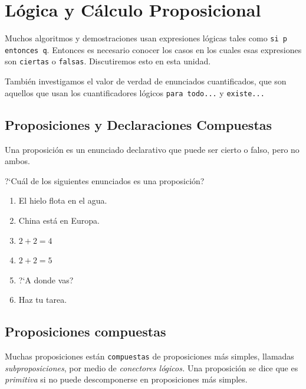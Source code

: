 \section{L\'ogica y C\'alculo Proposicional}


    Muchos algoritmos y demostraciones usan expresiones l\'ogicas tales como
    \texttt{si p entonces q}. Entonces es necesario conocer los casos en los cuales esas expresiones son \texttt{ciertas} o \texttt{falsas}. Discutiremos esto en esta unidad. 





    Tambi\'en investigamos el valor de verdad de enunciados cuantificados, que son aquellos que usan los cuantificadores l\'ogicos \texttt{para todo...} y \texttt{existe...}


\subsection{Proposiciones y Declaraciones Compuestas}


    Una proposici\'on es un enunciado declarativo que puede ser cierto o falso, pero no ambos. 



    \begin{problema}
        ?`Cu\'al de los siguientes enunciados es una proposici\'on?
        \begin{multicols}{2}
            \begin{enumerate}
                \item El hielo flota en el agua.
                \item China est\'a en Europa.
                \item $2+2=4$
                \item $2+2=5$
                \item ?`A donde vas?
                \item Haz tu tarea.
            \end{enumerate}
        \end{multicols}
    \end{problema}
    


\subsection{Proposiciones compuestas}


    Muchas proposiciones est\'an \texttt{compuestas} de proposiciones m\'as simples, llamadas \emph{subproposiciones}, por medio de \emph{conectores l\'ogicos.}  Una proposici\'on se dice que es \emph{primitiva} si no puede descomponerse en proposiciones m\'as simples.



